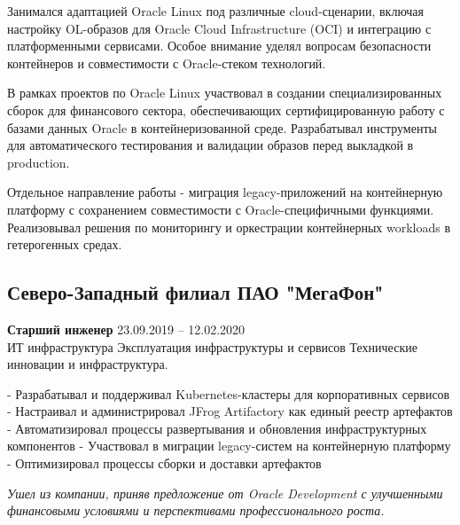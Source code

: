 \documentclass[11pt]{article}
\begin{document}
Занимался адаптацией Oracle Linux под различные cloud-сценарии, включая настройку OL-образов для Oracle Cloud Infrastructure (OCI) и интеграцию с платформенными сервисами. Особое внимание уделял вопросам безопасности контейнеров и совместимости с Oracle-стеком технологий.

В рамках проектов по Oracle Linux участвовал в создании специализированных сборок для финансового сектора, обеспечивающих сертифицированную работу с базами данных Oracle в контейнеризованной среде. Разрабатывал инструменты для автоматического тестирования и валидации образов перед выкладкой в production.

Отдельное направление работы - миграция legacy-приложений на контейнерную платформу с сохранением совместимости с Oracle-специфичными функциями. Реализовывал решения по мониторингу и оркестрации контейнерных workloads в гетерогенных средах.

\subsection{Северо-Западный филиал ПАО "МегаФон"}
\textbf{Старший инженер} \hfill 23.09.2019 -- 12.02.2020 \\
ИТ инфраструктура Эксплуатация инфраструктуры и сервисов Технические инновации и инфраструктура.

- Разрабатывал и поддерживал Kubernetes-кластеры для корпоративных сервисов
- Настраивал и администрировал JFrog Artifactory как единый реестр артефактов
- Автоматизировал процессы развертывания и обновления инфраструктурных компонентов
- Участвовал в миграции legacy-систем на контейнерную платформу
- Оптимизировал процессы сборки и доставки артефактов

\textit{Ушел из компании, приняв предложение от Oracle Development с улучшенными финансовыми условиями и перспективами профессионального роста.}
\end{document}
